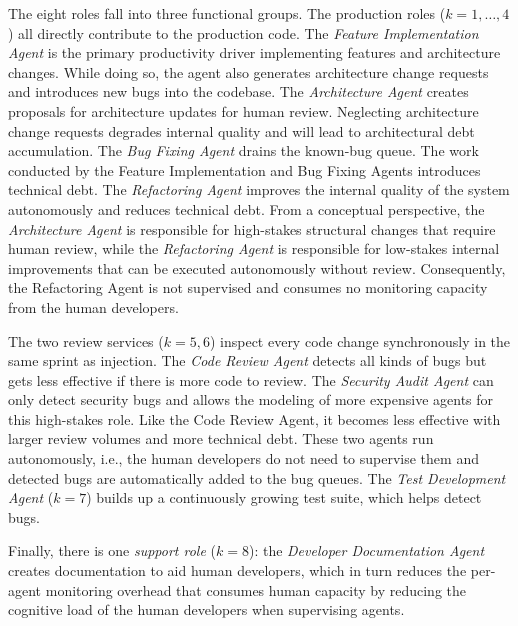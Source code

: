 \documentclass[smallextended]{svjour3}       %
\begin{document}
The eight roles fall into three functional groups. The production roles
($k = 1,\ldots,4$) all directly contribute to the production code. 
The \textit{Feature Implementation Agent} is the primary
productivity driver implementing features and architecture changes. While doing so, the agent also generates
architecture change requests and introduces new bugs into the codebase.
The \textit{Architecture Agent} creates proposals for architecture updates for human review. Neglecting architecture change requests degrades internal quality and will lead to architectural debt accumulation.
The \textit{Bug Fixing Agent} drains the known-bug
queue. The work conducted by the Feature Implementation and Bug Fixing Agents introduces technical debt.
The \textit{Refactoring Agent} improves the internal quality of the system autonomously and reduces technical debt.
From a conceptual perspective, the \textit{Architecture Agent} is responsible for high-stakes structural changes that require human review, while the \textit{Refactoring Agent} is responsible for low-stakes internal improvements that can be executed autonomously without review. Consequently, the Refactoring Agent is not supervised and consumes no monitoring capacity from the human developers. 

The two review services ($k = 5,6$) inspect
every code change synchronously in the same sprint as injection. The \textit{Code Review
Agent} detects all kinds of bugs but gets less effective if there is more code to review. The \textit{Security Audit Agent} can only detect security bugs and allows the modeling of more expensive agents for this high-stakes role. Like the Code Review Agent, it becomes less effective with larger review volumes and more technical debt. These two agents run autonomously, i.e., the human developers do not need to supervise them and detected bugs are automatically added to the bug queues.
The \textit{Test Development Agent} ($k = 7$) builds up a continuously growing test suite, which helps detect bugs.

Finally, there is one \emph{support role} ($k = 8$): the \textit{Developer Documentation Agent} creates documentation to aid human developers, which in turn reduces the
per-agent monitoring overhead that consumes human capacity by reducing the cognitive load
of the human developers when supervising agents.
\end{document}
